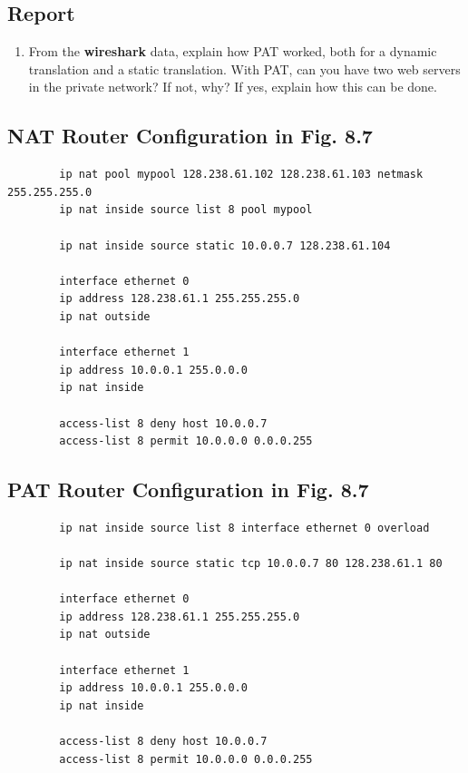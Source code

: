 \documentclass[10pt,a4paper]{article}
\numberwithin{equation}{section}
\numberwithin{figure}{section}
\numberwithin{table}{section}
\begin{document}
    \subsection*{Report}
    \begin{enumerate}
        \item From the \textbf{wireshark} data, explain how PAT worked, both for a dynamic translation and a static translation.
        With PAT, can you have two web servers in the private network?
        If not, why?
        If yes, explain how this can be done.
    \end{enumerate}

    \subsection*{NAT Router Configuration in Fig. 8.7}
    \begin{verbatim}
        ip nat pool mypool 128.238.61.102 128.238.61.103 netmask 255.255.255.0
        ip nat inside source list 8 pool mypool

        ip nat inside source static 10.0.0.7 128.238.61.104

        interface ethernet 0
        ip address 128.238.61.1 255.255.255.0
        ip nat outside

        interface ethernet 1
        ip address 10.0.0.1 255.0.0.0
        ip nat inside

        access-list 8 deny host 10.0.0.7
        access-list 8 permit 10.0.0.0 0.0.0.255
    \end{verbatim}
    \subsection*{PAT Router Configuration in Fig. 8.7}
    \begin{verbatim}
        ip nat inside source list 8 interface ethernet 0 overload

        ip nat inside source static tcp 10.0.0.7 80 128.238.61.1 80

        interface ethernet 0
        ip address 128.238.61.1 255.255.255.0
        ip nat outside

        interface ethernet 1
        ip address 10.0.0.1 255.0.0.0
        ip nat inside

        access-list 8 deny host 10.0.0.7
        access-list 8 permit 10.0.0.0 0.0.0.255
    \end{verbatim}

\iffalse
\end{document}
